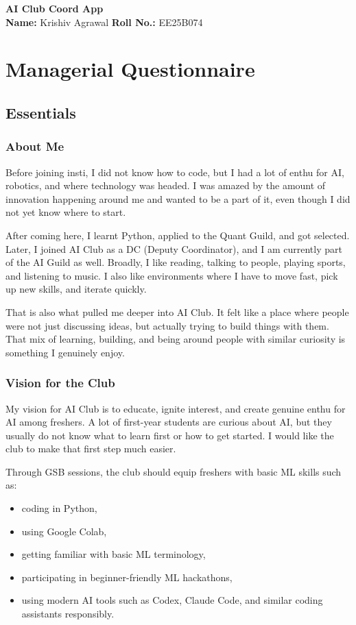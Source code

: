 \documentclass[11pt,a4paper]{article}
\begin{document}
\begin{center}
    {\Huge\bfseries AI Club Coord App}\\[0.9em]
    \textbf{Name:} Krishiv Agrawal \quad
    \textbf{Roll No.:} EE25B074
\end{center}

\vspace{0.6em}

\section{Managerial Questionnaire}

\subsection{Essentials}

\subsubsection{About Me}
Before joining insti, I did not know how to code, but I had a lot of enthu for AI, robotics, and where technology was headed. I was amazed by the amount of innovation happening around me and wanted to be a part of it, even though I did not yet know where to start.

After coming here, I learnt Python, applied to the Quant Guild, and got selected. Later, I joined AI Club as a DC (Deputy Coordinator), and I am currently part of the AI Guild as well. Broadly, I like reading, talking to people, playing sports, and listening to music. I also like environments where I have to move fast, pick up new skills, and iterate quickly.

That is also what pulled me deeper into AI Club. It felt like a place where people were not just discussing ideas, but actually trying to build things with them. That mix of learning, building, and being around people with similar curiosity is something I genuinely enjoy.

\subsubsection{Vision for the Club}
My vision for AI Club is to educate, ignite interest, and create genuine enthu for AI among freshers. A lot of first-year students are curious about AI, but they usually do not know what to learn first or how to get started. I would like the club to make that first step much easier.

Through GSB sessions, the club should equip freshers with basic ML skills such as:
\begin{itemize}
    \item coding in Python,
    \item using Google Colab,
    \item getting familiar with basic ML terminology,
    \item participating in beginner-friendly ML hackathons,
    \item using modern AI tools such as Codex, Claude Code, and similar coding assistants responsibly.
\end{itemize}
\end{document}
